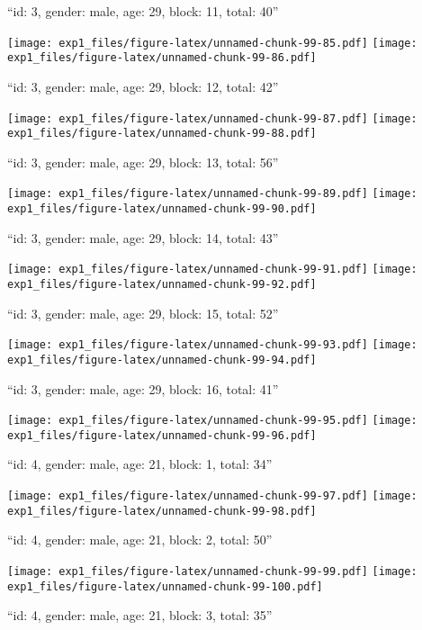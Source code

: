\documentclass[,]{article}
\begin{document}
``id: 3, gender: male, age: 29, block: 11, total: 40''

\texttt{[image: exp1\_files/figure-latex/unnamed-chunk-99-85.pdf]}
\texttt{[image: exp1\_files/figure-latex/unnamed-chunk-99-86.pdf]}

\newpage
[1] 

``id: 3, gender: male, age: 29, block: 12, total: 42''

\texttt{[image: exp1\_files/figure-latex/unnamed-chunk-99-87.pdf]}
\texttt{[image: exp1\_files/figure-latex/unnamed-chunk-99-88.pdf]}

\newpage
[1] 

``id: 3, gender: male, age: 29, block: 13, total: 56''

\texttt{[image: exp1\_files/figure-latex/unnamed-chunk-99-89.pdf]}
\texttt{[image: exp1\_files/figure-latex/unnamed-chunk-99-90.pdf]}

\newpage
[1] 

``id: 3, gender: male, age: 29, block: 14, total: 43''

\texttt{[image: exp1\_files/figure-latex/unnamed-chunk-99-91.pdf]}
\texttt{[image: exp1\_files/figure-latex/unnamed-chunk-99-92.pdf]}

\newpage
[1] 

``id: 3, gender: male, age: 29, block: 15, total: 52''

\texttt{[image: exp1\_files/figure-latex/unnamed-chunk-99-93.pdf]}
\texttt{[image: exp1\_files/figure-latex/unnamed-chunk-99-94.pdf]}

\newpage
[1] 

``id: 3, gender: male, age: 29, block: 16, total: 41''

\texttt{[image: exp1\_files/figure-latex/unnamed-chunk-99-95.pdf]}
\texttt{[image: exp1\_files/figure-latex/unnamed-chunk-99-96.pdf]}

\newpage
[1] 

``id: 4, gender: male, age: 21, block: 1, total: 34''

\texttt{[image: exp1\_files/figure-latex/unnamed-chunk-99-97.pdf]}
\texttt{[image: exp1\_files/figure-latex/unnamed-chunk-99-98.pdf]}

\newpage
[1] 

``id: 4, gender: male, age: 21, block: 2, total: 50''

\texttt{[image: exp1\_files/figure-latex/unnamed-chunk-99-99.pdf]}
\texttt{[image: exp1\_files/figure-latex/unnamed-chunk-99-100.pdf]}

\newpage
[1] 

``id: 4, gender: male, age: 21, block: 3, total: 35''
\end{document}
